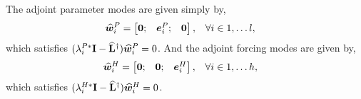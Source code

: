 The adjoint parameter modes are given simply by,
\begin{align}
	\label{eqn:adjoint_pmode} 
	{\widehat{ \boldsymbol{w} }}^{P}_{i} &= \begin{bmatrix}
		\boldsymbol{0}; &
		\boldsymbol{e}^{P}_{i}; &
		\boldsymbol{0}
	\end{bmatrix}, && \forall i \in 1,\ldots l,
\end{align}
which satisfies $(\lambda^{P*}_{i}\mathbf{I} - \mathbf{\widehat{L}}^{\dagger}){\widehat{\boldsymbol{w}}}^{P}_{i} = 0$. And the adjoint forcing modes are given by,
\begin{align}
	\label{eqn:adjoint_hmode} 
	{\widehat{ \boldsymbol{w} }}^{H}_{i} &= \begin{bmatrix}
		\boldsymbol{0}; &
		\boldsymbol{0}; &
		\boldsymbol{e}^{H}_{i}
	\end{bmatrix}, && \forall i \in 1,\ldots h,
\end{align}
which satisfies $(\lambda^{H*}_{i}\mathbf{I} - \mathbf{\widehat{L}}^{\dagger}){\widehat{\boldsymbol{w}}}^{H}_{i} = 0$.

